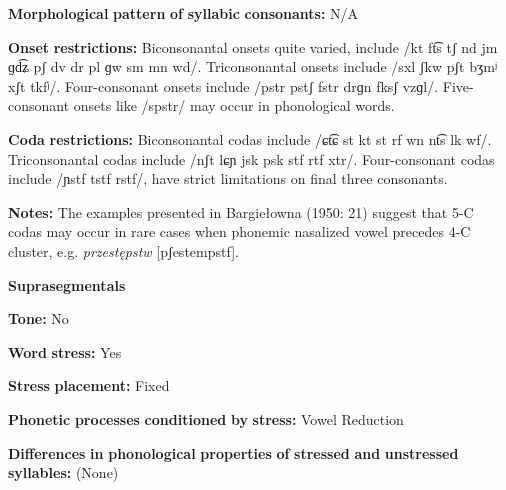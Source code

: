 \documentclass[output=paper]{langsci/langscibook}
\begin{document}
\begin{styleBody}
\textbf{Morphological} \textbf{pattern} \textbf{of} \textbf{syllabic} \textbf{consonants:} N/A
\end{styleBody}

\begin{styleBody}
\textbf{Onset} \textbf{restrictions:} Biconsonantal onsets quite varied, include /kt ft͡s tʃ nd jm ɡd͡ʑ pʃ dv dr pl ɡw sm mn wd/. Triconsonantal onsets include /sxl ʃkw pʃt bʒmʲ xʃt tkfʲ/. Four-consonant onsets include /pstr pstʃ fstr drɡn fksʃ vzɡl/. Five-consonant onsets like /spstr/ may occur in phonological words.
\end{styleBody}

\begin{styleBody}
\textbf{Coda} \textbf{restrictions:} Biconsonantal codas include /ɕt͡ɕ st kt st rf wn nt͡s lk wf/. Triconsonantal codas include /nʃt lɕɲ jsk psk stf rtf xtr/. Four-consonant codas include /ɲstf tstf rstf/, have strict limitations on final three consonants.
\end{styleBody}

\begin{styleBody}
\textbf{Notes:} The examples presented in Bargiełowna (1950: 21) suggest that 5-C codas may occur in rare cases when phonemic nasalized vowel precedes 4-C cluster, e.g. \textit{przestępstw} [pʃestempstf].
\end{styleBody}

\begin{styleBody}
\textbf{Suprasegmentals}
\end{styleBody}

\begin{styleBody}
\textbf{Tone:} No
\end{styleBody}

\begin{styleBody}
\textbf{Word} \textbf{stress:} Yes
\end{styleBody}

\begin{styleBody}
\textbf{Stress} \textbf{placement:} Fixed
\end{styleBody}

\begin{styleBody}
\textbf{Phonetic} \textbf{processes} \textbf{conditioned} \textbf{by} \textbf{stress:} Vowel Reduction
\end{styleBody}

\begin{styleBody}
\textbf{Differences} \textbf{in} \textbf{phonological} \textbf{properties} \textbf{of} \textbf{stressed} \textbf{and} \textbf{unstressed} \textbf{syllables:} (None)
\end{styleBody}
\end{document}
